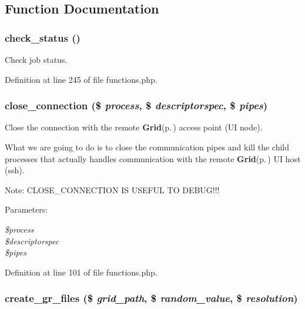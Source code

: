 \subsection{Function Documentation}
\subsubsection{\setlength{\rightskip}{0pt plus 5cm}check\_\-status ()}\label{functions_8php_a6}


Check job status. 



Definition at line 245 of file functions.php.
\subsubsection{\setlength{\rightskip}{0pt plus 5cm}close\_\-connection (\$ {\em process}, \$ {\em descriptorspec}, \$ {\em pipes})}\label{functions_8php_a1}


Close the connection with the remote {\bf Grid}{\rm (p.\,\pageref{classGrid})} access point (UI node). 

What we are going to do is to close the communication pipes and kill the child processes that actually handles communication with the remote {\bf Grid}{\rm (p.\,\pageref{classGrid})} UI host (ssh).

\begin{Desc}
\item[Note:]CLOSE\_\-CONNECTION IS USEFUL TO DEBUG!!!\end{Desc}
\begin{Desc}
\item[Parameters:]
\begin{description}
\item[{\em \$process}]\item[{\em \$descriptorspec}]\item[{\em \$pipes}]\end{description}
\end{Desc}


Definition at line 101 of file functions.php.
\subsubsection{\setlength{\rightskip}{0pt plus 5cm}create\_\-gr\_\-files (\$ {\em grid\_\-path}, \$ {\em random\_\-value}, \$ {\em resolution})}\label{functions_8php_a8}


